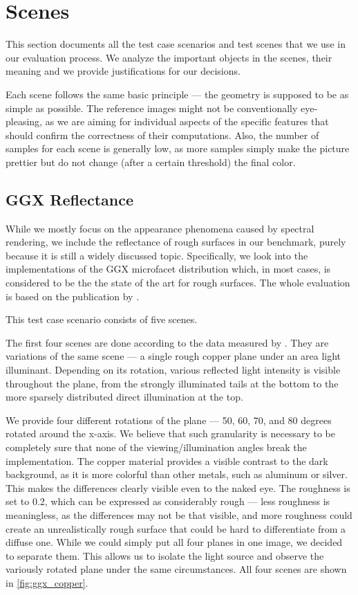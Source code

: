 \section{Scenes}
\label{sec:scenes}

This section documents all the test case scenarios and test scenes that we use in our evaluation process. We analyze the important objects in the scenes, their meaning and we provide justifications for our decisions. 

Each scene follows the same basic principle --- the geometry is supposed to be as simple as possible. The reference images might not be conventionally eye-pleasing, as we are aiming for individual aspects of the specific features that should confirm the correctness of their computations. Also, the number of samples for each scene is generally low, as more samples simply make the picture prettier but do not change (after a certain threshold) the final color.

\subsection{GGX Reflectance}

While we mostly focus on the appearance phenomena caused by spectral rendering, we include the reflectance of rough surfaces in our benchmark, purely because it is still a widely discussed topic. Specifically, we look into the implementations of the GGX microfacet distribution which, in most cases, is considered to be the the state of the art for rough surfaces. The whole evaluation is based on the publication by \citet{walter2007microfacet}.

This test case scenario consists of five scenes.

The first four scenes are done according to the data measured by \citet{walter2007microfacet}. They are variations of the same scene --- a single rough copper plane under an area light illuminant. Depending on its rotation, various reflected light intensity is visible throughout the plane, from the strongly illuminated tails at the bottom to the more sparsely distributed direct illumination at the top.

We provide four different rotations of the plane --- 50, 60, 70, and 80 degrees rotated around the x-axis. We believe that such granularity is necessary to be completely sure that none of the viewing/illumination angles break the implementation. The copper material provides a visible contrast to the dark background, as it is more colorful than other metals, such as aluminum or silver. This makes the differences clearly visible even to the naked eye. The roughness is set to 0.2, which can be expressed as considerably rough --- less roughness is meaningless, as the differences may not be that visible, and more roughness could create an unrealistically rough surface that could be hard to differentiate from a diffuse one. While we could simply put all four planes in one image, we decided to separate them. This allows us to isolate the light source and observe the variously rotated plane under the same circumstances. All four scenes are shown in \autoref{fig:ggx_copper}.

